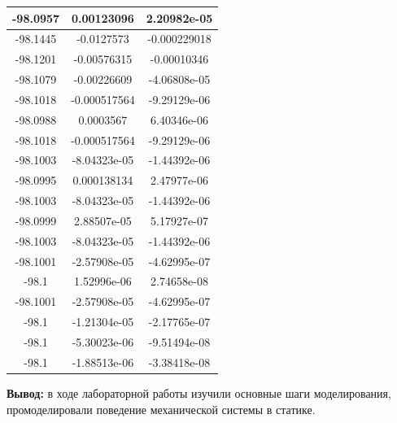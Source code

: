 \documentclass[a4paper,14pt]{extarticle}
\begin{document}
\begin{enumerate}[1. ]
\begin{center}
\begin{longtable}{|c|c|c|}
                  \hline
                  -98.0957 & 0.00123096   & 2.20982e-05  \\
                  \hline
                  -98.1445 & -0.0127573   & -0.000229018 \\
                  \hline
                  -98.1201 & -0.00576315  & -0.00010346  \\
                  \hline
                  -98.1079 & -0.00226609  & -4.06808e-05 \\
                  \hline
                  -98.1018 & -0.000517564 & -9.29129e-06 \\
                  \hline
                  -98.0988 & 0.0003567    & 6.40346e-06  \\
                  \hline
                  -98.1018 & -0.000517564 & -9.29129e-06 \\
                  \hline
                  -98.1003 & -8.04323e-05 & -1.44392e-06 \\
                  \hline
                  -98.0995 & 0.000138134  & 2.47977e-06  \\
                  \hline
                  -98.1003 & -8.04323e-05 & -1.44392e-06 \\
                  \hline
                  -98.0999 & 2.88507e-05  & 5.17927e-07  \\
                  \hline
                  -98.1003 & -8.04323e-05 & -1.44392e-06 \\
                  \hline
                  -98.1001 & -2.57908e-05 & -4.62995e-07 \\
                  \hline
                  -98.1    & 1.52996e-06  & 2.74658e-08  \\
                  \hline
                  -98.1001 & -2.57908e-05 & -4.62995e-07 \\
                  \hline
                  -98.1    & -1.21304e-05 & -2.17765e-07 \\
                  \hline
                  -98.1    & -5.30023e-06 & -9.51494e-08 \\
                  \hline
                  \rowcolor{Yellow}
                  -98.1    & -1.88513e-06 & -3.38418e-08 \\
                  \hline
              \end{longtable}
          \end{center}

\end{enumerate}

\textbf{Вывод: } в ходе лабораторной работы изучили основные шаги моделирования,
промоделировали поведение механической системы в статике.
\end{document}
